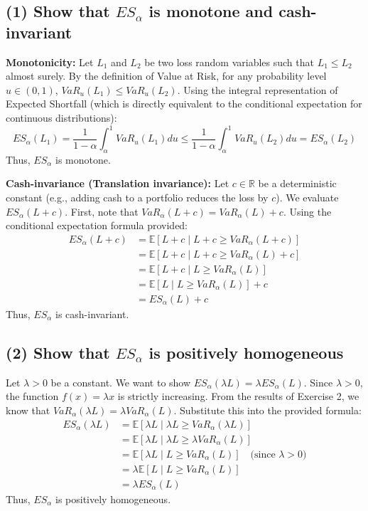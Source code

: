 \subsection*{(1) Show that $ES_{\alpha}$ is monotone and cash-invariant}

\textbf{Monotonicity:}
Let $L_1$ and $L_2$ be two loss random variables such that $L_1 \le L_2$ almost surely. 
By the definition of Value at Risk, for any probability level $u \in (0,1)$, $VaR_u(L_1) \le VaR_u(L_2)$.
Using the integral representation of Expected Shortfall (which is directly equivalent to the conditional expectation for continuous distributions):
\begin{equation*}
ES_{\alpha}(L_1) = \frac{1}{1-\alpha}\int_{\alpha}^1 VaR_u(L_1) du \le \frac{1}{1-\alpha}\int_{\alpha}^1 VaR_u(L_2) du = ES_{\alpha}(L_2)
\end{equation*}
Thus, $ES_{\alpha}$ is monotone.

\textbf{Cash-invariance (Translation invariance):}
Let $c \in \mathbb{R}$ be a deterministic constant (e.g., adding cash to a portfolio reduces the loss by $c$). We evaluate $ES_{\alpha}(L + c)$.
First, note that $VaR_{\alpha}(L + c) = VaR_{\alpha}(L) + c$.
Using the conditional expectation formula provided:
\begin{align*}
ES_{\alpha}(L + c) &= \mathbb{E}[L + c \mid L + c \ge VaR_{\alpha}(L + c)] \\
&= \mathbb{E}[L + c \mid L + c \ge VaR_{\alpha}(L) + c] \\
&= \mathbb{E}[L + c \mid L \ge VaR_{\alpha}(L)] \\
&= \mathbb{E}[L \mid L \ge VaR_{\alpha}(L)] + c \\
&= ES_{\alpha}(L) + c
\end{align*}
Thus, $ES_{\alpha}$ is cash-invariant.


\subsection*{(2) Show that $ES_{\alpha}$ is positively homogeneous}

Let $\lambda > 0$ be a constant. We want to show $ES_{\alpha}(\lambda L) = \lambda ES_{\alpha}(L)$.
Since $\lambda > 0$, the function $f(x) = \lambda x$ is strictly increasing. 
From the results of Exercise 2, we know that $VaR_{\alpha}(\lambda L) = \lambda VaR_{\alpha}(L)$.
Substitute this into the provided formula:
\begin{align*}
ES_{\alpha}(\lambda L) &= \mathbb{E}[\lambda L \mid \lambda L \ge VaR_{\alpha}(\lambda L)] \\
&= \mathbb{E}[\lambda L \mid \lambda L \ge \lambda VaR_{\alpha}(L)] \\
&= \mathbb{E}[\lambda L \mid L \ge VaR_{\alpha}(L)] \quad \text{(since } \lambda > 0 \text{)} \\
&= \lambda \mathbb{E}[L \mid L \ge VaR_{\alpha}(L)] \\
&= \lambda ES_{\alpha}(L)
\end{align*}
Thus, $ES_{\alpha}$ is positively homogeneous.


